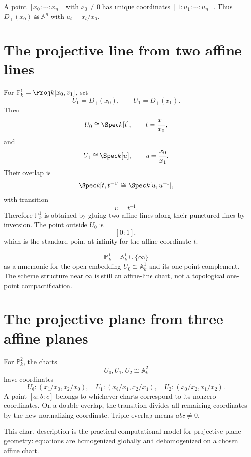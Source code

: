 

\begin{example}\label{ex:vi36-expand-01}
A point $[x_0:\cdots:x_n]$ with $x_0\ne0$ has unique coordinates $[1:u_1:\cdots:u_n]$.  Thus $D_+(x_0)\cong\mathbb A^n$ with $u_i=x_i/x_0$.
\end{example}
\section{The projective line from two affine lines}
For \(\mathbb P^1_k=\Proj k[x_0,x_1]\), set
\[
U_0=D_+(x_0),\qquad U_1=D_+(x_1).
\]
Then
\[
U_0\cong\Spec k[t],\qquad t=\frac{x_1}{x_0},
\]
and
\[
U_1\cong\Spec k[u],\qquad u=\frac{x_0}{x_1}.
\]
Their overlap is
\[
\Spec k[t,t^{-1}]\cong\Spec k[u,u^{-1}],
\]
with transition
\[
u=t^{-1}.
\]
Therefore \(\mathbb P^1_k\) is obtained by gluing two affine lines along their punctured lines by inversion.  The point outside \(U_0\) is
\[
[0:1],
\]
which is the standard point at infinity for the affine coordinate \(t\).

\begin{corollary}
\[
\mathbb P^1_k=\mathbb A^1_k\cup\{\infty\}
\]
as a mnemonic for the open embedding \(U_0\cong\mathbb A^1_k\) and its one-point complement.  The scheme structure near \(\infty\) is still an affine-line chart, not a topological one-point compactification.
\end{corollary}



\section{The projective plane from three affine planes}
For \(\mathbb P^2_k\), the charts
\[
U_0,U_1,U_2\cong\mathbb A^2_k
\]
have coordinates
\[
U_0:(x_1/x_0,x_2/x_0),\quad
U_1:(x_0/x_1,x_2/x_1),\quad
U_2:(x_0/x_2,x_1/x_2).
\]
A point \([a:b:c]\) belongs to whichever charts correspond to its nonzero coordinates.  On a double overlap, the transition divides all remaining coordinates by the new normalizing coordinate.  Triple overlap means \(abc\ne0\).

This chart description is the practical computational model for projective plane geometry: equations are homogenized globally and dehomogenized on a chosen affine chart.

